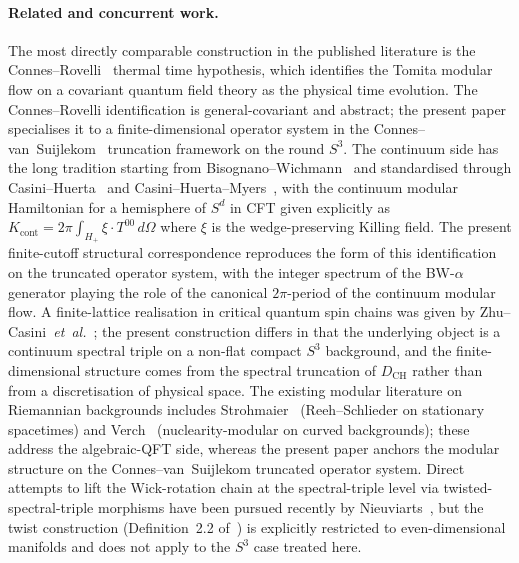 \documentclass[11pt,a4paper]{article}
\theoremstyle{plain}
\theoremstyle{definition}
\newcommand{\sthree}{S^{3}}
\newcommand{\DCH}{D_{\mathrm{CH}}}
\begin{document}
\paragraph{Related and concurrent work.}
The most directly comparable construction in the published literature
is the Connes--Rovelli~\cite{connes_rovelli1994} thermal time
hypothesis, which identifies the Tomita modular flow on a covariant
quantum field theory as the physical time evolution. The
Connes--Rovelli identification is general-covariant and abstract;
the present paper specialises it to a finite-dimensional operator
system in the Connes--van~Suijlekom~\cite{connes_vs2021} truncation
framework on the round $\sthree$. The continuum side has the long
tradition starting from Bisognano--Wichmann~\cite{bisognano_wichmann1976}
and standardised through Casini--Huerta~\cite{casini_huerta2009} and
Casini--Huerta--Myers~\cite{casini_huerta_myers2011}, with the
continuum modular Hamiltonian for a hemisphere of $S^d$ in CFT given
explicitly as $K_{\mathrm{cont}} = 2\pi \int_{H_+} \xi \cdot T^{00}\,d\Omega$
where $\xi$ is the wedge-preserving Killing field. The present
finite-cutoff structural correspondence reproduces the form of this
identification on the truncated operator system, with the integer
spectrum of the BW-$\alpha$ generator playing the role of the
canonical $2\pi$-period of the continuum modular flow. A finite-lattice
realisation in critical quantum spin chains was given by
Zhu--Casini~\emph{et~al.}~\cite{zhu_casini2020}; the present
construction differs in that the underlying object is a continuum
spectral triple on a non-flat compact $\sthree$ background, and the
finite-dimensional structure comes from the spectral truncation of
$\DCH$ rather than from a discretisation of physical space. The
existing modular literature on Riemannian backgrounds includes
Strohmaier~\cite{strohmaier2006} (Reeh--Schlieder on stationary
spacetimes) and Verch~\cite{verch2001} (nuclearity-modular on curved
backgrounds); these address the algebraic-QFT side, whereas the
present paper anchors the modular structure on the
Connes--van~Suijlekom truncated operator system. Direct attempts to
lift the Wick-rotation chain at the spectral-triple level via
twisted-spectral-triple morphisms have been pursued recently by
Nieuviarts~\cite{nieuviarts2025a, nieuviarts2024,
nieuviarts2025b_proceedings}, but the twist construction
(Definition~2.2 of~\cite{nieuviarts2025a}) is explicitly restricted to
even-dimensional manifolds and does not apply to the $\sthree$ case
treated here.
\end{document}
